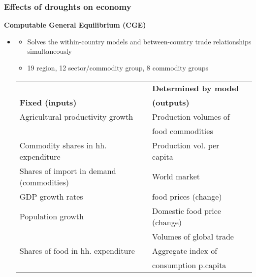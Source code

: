 \documentclass{beamer}              %
\begin{document}
\begin{frame}

\frametitle{Effects of droughts on economy}\label{Effects} 
\begin{block}{\textbf{Computable General Equilibrium (CGE)}}
\begin{itemize}

\item[~] \underline{\textbf{\cite{OxfamIDS}}}
\begin{itemize}
\item Solves the within-country models and between-country trade
relationships simultaneously
\item 19 region, 12 sector/commodity group, 8 commodity groups
\end{itemize}
\begin{table}
\begin{footnotesize}
\begin{tabular}{lll} 
\hline
\rowcolor{PaleGreen}  & \textbf{Determined by model}  \\
\rowcolor{PaleGreen} \textbf{Fixed (inputs)} & \textbf{(outputs)}  \\
 \hline
Agricultural productivity growth	& Production volumes of \\
&  \hspace{0.5cm}food commodities \\
Commodity shares in hh. expenditure &Production vol. per capita \\
Shares of import in demand (commodities) & World market  \\
GDP growth rates&\hspace{0.5cm} food prices (change)\\
Population growth& Domestic food price (change)\\
& Volumes of global trade\\
Shares of food in hh. expenditure  & Aggregate index of
\\
 & \hspace{0.5cm}consumption p.capita
\\
 \hline
\end{tabular}
\end{footnotesize}
\end{table}

\end{itemize}
\end{block}
\end{frame}


\end{document}
